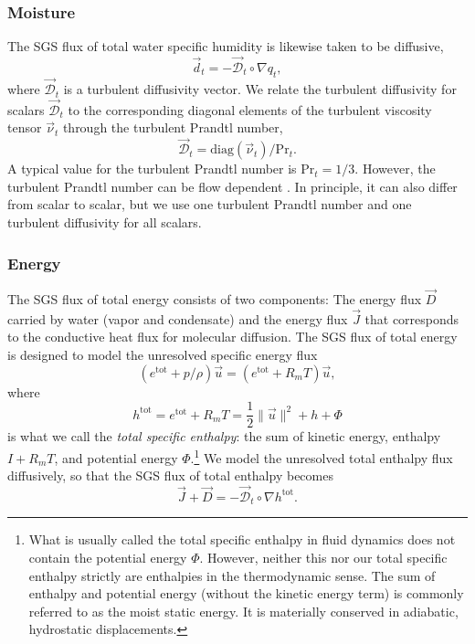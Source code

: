 \documentclass{report}
\begin{document}
\subsubsection{Moisture}

The SGS flux of total water specific humidity is likewise taken to be diffusive,
\begin{equation}\label{eq:sgs-shum-flux}
\vec{d}_{t} = - \vec{\mathcal{D}}_t \circ \nabla q_t,
\end{equation}
where $\vec{\mathcal{D}}_t$ is a turbulent diffusivity vector. We relate the turbulent diffusivity for scalars $\vec{\mathcal{D}}_t$ to the corresponding diagonal elements of the turbulent viscosity tensor $\vec{\nu}_t$ through the turbulent Prandtl number, 
\begin{equation}
\vec{\mathcal{D}}_t = \mathrm{diag}(\vec{\nu}_t) / \mathrm{Pr}_{t}.
\end{equation} 
A typical value for the turbulent Prandtl number is $\mathrm{Pr}_{t} = 1/3$. However, the turbulent Prandtl number can be flow dependent \citep[e.g.,][]{Deardorff80a}. In principle, it can also differ from scalar to scalar, but we use one turbulent Prandtl number and one turbulent diffusivity for all scalars. 

\subsubsection{Energy}

The SGS flux of total energy consists of two components: The energy flux $\vec{D}$ carried by water (vapor and condensate) and the energy flux $\vec{J}$ that corresponds to the conductive heat flux for molecular diffusion. The SGS flux of total energy is designed to model the unresolved specific energy flux 
\[
(e^{\mathrm{tot}} + p/\rho) \vec{u} = (e^{\mathrm{tot}} + R_m T) \vec{u}, 
\]
where
\[
h^{\mathrm{tot}} = e^{\mathrm{tot}} + R_m T = \frac{1}{2} \| \vec{u} \|^2 + h + \Phi
\]
is what we call the \emph{total specific enthalpy}: the sum of kinetic energy, enthalpy $I + R_m T$, and potential energy $\Phi$.\footnote{What is usually called the total specific enthalpy in fluid dynamics does not contain the potential energy $\Phi$. However, neither this nor our total specific enthalpy strictly are enthalpies in the thermodynamic sense. The sum of enthalpy and potential energy (without the kinetic energy term) is commonly referred to as the moist static energy. It is materially conserved in adiabatic, hydrostatic displacements.} We model the unresolved total enthalpy flux diffusively, so that the SGS flux of total enthalpy becomes
\begin{equation}\label{e:SGS_energy_flux}
\vec{J} + \vec{D} = - \vec{\mathcal{D}}_t \circ \nabla h^{\mathrm{tot}}.
\end{equation}
\end{document}
